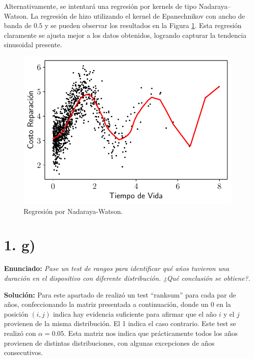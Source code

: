 \documentclass[fleqn]{article}
\begin{document}
Alternativamente, se intentará una regresión por kernels de tipo Nadaraya–Watson. La regresión de hizo utilizando el kernel de Epanechnikov con ancho de banda de $0.5$ y se pueden observar los resultados en la Figura \ref{fig:1f3}. Esta regresión claramente se ajusta mejor a los datos obtenidos, logrando capturar la tendencia sinusoidal presente.
\begin{figure}[H]
    \centering
    \includegraphics[scale=.6]{1f_nw.pdf}
    \caption{Regresión por Nadaraya-Watson.}
    \label{fig:1f3}
\end{figure}

\section*{1. g)}
\textbf{Enunciado:} \textit{Pase un test de rangos para identificar qué años tuvieron una duración en el dispositivo con diferente distribución. ¿Qué conclusión se obtiene?.}

\textbf{Solución:} Para este apartado de realizó un test ``ranksum'' para cada par de años, confeccionando la matriz presentada a continuación, donde un 0 en la  posición $(i,j)$ indica hay evidencia suficiente para afirmar que el año $i$ y el $j$ provienen de la misma distribución. El 1 indica el caso contrario. Este test se realizó con $\alpha=0.05$. Esta matriz nos indica que prácticamente todos los años provienen de distintas distribuciones, con algunas excepciones de años consecutivos.
\end{document}

